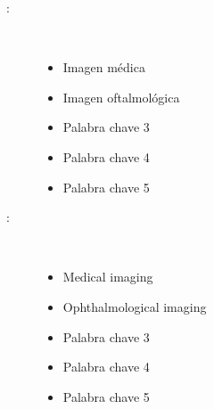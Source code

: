 \begin{multicols}{2}
  \begin{description}
  \item [\palabraschaveprincipal:] \mbox{} \\[-20pt]
  \begin{itemize}
      \item Imagen médica
      \item Imagen oftalmológica
      \item Palabra chave 3
      \item Palabra chave 4
      \item Palabra chave 5
  \end{itemize}
  
  \end{description}
  \begin{description}
  \item [\palabraschavesecundaria:] \mbox{} \\[-20pt]
  \begin{itemize}
      \item Medical imaging
      \item Ophthalmological imaging
      \item Palabra chave 3
      \item Palabra chave 4
      \item Palabra chave 5
  \end{itemize}
  \end{description}
  \end{multicols}
  